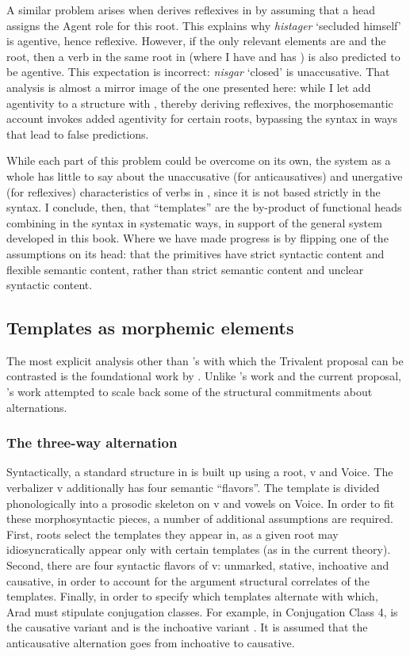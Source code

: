 A similar problem arises when \citet[60]{doron03} derives reflexives in {\thit} by assuming that a head  assigns the Agent role for this root. This explains why \emph{histager} `secluded himself' is agentive, hence reflexive. However, if the only relevant elements are {\vz} and the root, then a verb in the same root in {\tnif} (where I have {\vz} and \citealt{doron03} has ) is also predicted to be agentive. This expectation is incorrect: \emph{nisgar} `closed' is unaccusative. That analysis is almost a mirror image of the one presented here: while I let {\va} add agentivity to a structure with \vz, thereby deriving reflexives, the morphosemantic account invokes added agentivity for certain roots, bypassing the syntax in ways that lead to false predictions.

While each part of this problem could be overcome on its own, the system as a whole has little to say about the unaccusative (for anticausatives) and unergative (for reflexives) characteristics of verbs in {\thit}, since it is not based strictly in the syntax. I conclude, then, that ``templates'' are the by-product of functional heads combining in the syntax in systematic ways, in support of the general system developed in this book. Where we have made progress is by flipping one of the assumptions on its head: that the primitives have strict syntactic content and flexible semantic content, rather than strict semantic content and unclear syntactic content.

	\subsection{Templates as morphemic elements} \label{vz:others:morph}
The most explicit analysis other than \citeauthor{doron03}'s with which the Trivalent proposal can be contrasted is the foundational work by \cite{arad03,arad05}. Unlike \citeauthor{doron03}'s work and the current proposal, \cite{arad05}'s work attempted to scale back some of the structural commitments about alternations.

		\subsubsection{The three-way alternation}
Syntactically, a standard structure in \cite{arad05} is built up using a root, v and Voice. The verbalizer v additionally has four semantic ``flavors''. The template is divided phonologically into a prosodic skeleton on v and vowels on Voice. In order to fit these morphosyntactic pieces, a number of additional assumptions are required. First, roots select the templates they appear in, as a given root may idiosyncratically appear only with certain templates (as in the current theory). Second, there are four syntactic flavors of v: unmarked, stative, inchoative and causative, in order to account for the argument structural correlates of the templates. Finally, in order to specify which templates alternate with which, Arad must stipulate conjugation classes. For example, in Conjugation Class 4, {\tpie} is the causative variant and {\thit} is the inchoative variant \citep[220]{arad05}. It is assumed that the anticausative alternation goes from inchoative to causative.
		
